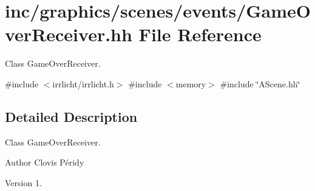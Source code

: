 \hypertarget{GameOverReceiver_8hh}{}\section{inc/graphics/scenes/events/\+Game\+Over\+Receiver.hh File Reference}
\label{GameOverReceiver_8hh}


Class Game\+Over\+Receiver.  


{\ttfamily \#include $<$irrlicht/irrlicht.\+h$>$}\newline
{\ttfamily \#include $<$memory$>$}\newline
{\ttfamily \#include \char`\"{}A\+Scene.\+hh\char`\"{}}\newline


\subsection{Detailed Description}
Class Game\+Over\+Receiver. 

\begin{DoxyAuthor}{Author}
Clovis Péridy 
\end{DoxyAuthor}
\begin{DoxyVersion}{Version}
1. 
\end{DoxyVersion}
